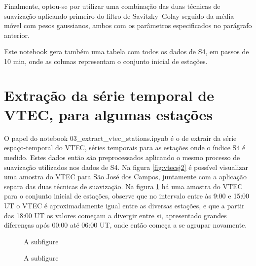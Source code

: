 Finalmente, optou-se por utilizar uma combinação das duas técnicas de suavização aplicando primeiro do filtro de Savitzky–Golay seguido da média móvel com pesos gaussianos, ambos com os parâmetros especificados no parágrafo anterior.

Este notebook gera também uma tabela com todos os dados de S4, em passos de 10 min, onde as colunas representam o conjunto inicial de estações.

\section{Extração da série temporal de VTEC, para algumas estações}

O papel do notebook 03\_extract\_vtec\_stations.ipynb é o de extrair da série espaço-temporal do VTEC, séries temporais para as estações onde o índice S4 é medido. Estes dados então são preprocessados aplicando o mesmo processo de suavização utilizados nos dados de S4. Na figura \ref{fig:vtecsj2} é possível visualizar uma amostra do VTEC para São José dos Campos, juntamente com a aplicação separa das duas técnicas de suavização. Na figura \ref{fig:vtecsignal} há uma amostra do VTEC para o conjunto inicial de estações, observe que no intervalo entre às 9:00 e 15:00 UT o VTEC é aproximadamente igual entre as diversas estações, e que a partir das 18:00 UT os valores começam a divergir entre si, apresentado grandes diferenças após 00:00 até 06:00 UT, onde então começa a se agrupar novamente.

\begin{figure}[H]
\centering
{}
\caption{A subfigure}
\label{fig:vtecsj2}
\caption{A subfigure}
\label{fig:vtecsignal}
\end{figure}

